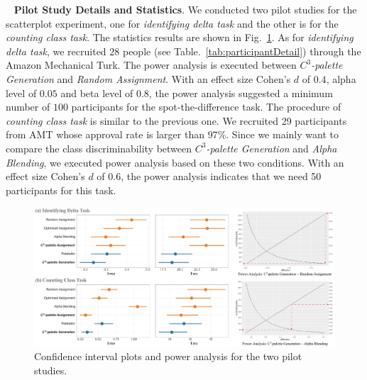 \documentclass[review,onecolumn]{vgtc}                %
\newcommand{\myparagraph}[1]{\mbox{\ } \newline \noindent \textbf{#1}}
\renewcommand{\paragraph}[1]{\myparagraph{#1}}
\begin{document}
\paragraph{Pilot Study Details and Statistics}.
We conducted two pilot studies for the scatterplot experiment, one for \emph{identifying delta task} and the other is for the \emph{counting class task}. The statistics results are shown in Fig.~\ref{fig:pilotResults}.
As for \emph{identifying delta task}, we recruited $28$ people (see Table.~\ref{tab:participantDetail}) through the Amazon Mechanical Turk. The power analysis is executed between \emph{$C^3$-palette Generation} and \emph{Random Assignment}. With an effect size Cohen's $d$ of $0.4$, alpha level of $0.05$ and beta level of $0.8$, the power analysis suggested a minimum number of $100$ participants for the spot-the-difference task.
The procedure of \emph{counting class task} is similar to the previous one. We recruited 29 participants from AMT whose approval rate is larger than $97\%$. Since we mainly want to compare the class discriminability between \emph{$C^3$-palette Generation} and \emph{Alpha Blending}, we executed power analysis based on these two conditions.  With an effect size Cohen's $d$ of $0.6$, the power analysis indicates that we need 50 participants for this task.

\begin{figure}[h]
\centering
\includegraphics[width=1\linewidth]{user-result-pilot.pdf}
\caption{Confidence interval plots and power analysis for the two pilot studies.
}
\vspace*{-5mm}
\label{fig:pilotResults}
\end{figure}
\end{document}
